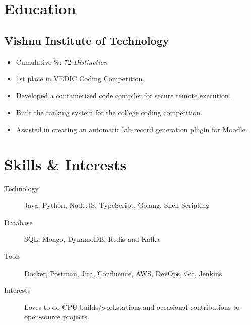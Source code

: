 \documentclass[11pt]{article}
\begin{document}
\section{Education}
\subsection{Vishnu Institute of Technology  }
\begin{itemize}
    \item Cumulative \(\%\): 72 \textit{Distinction}
    \item 1st place in VEDIC Coding Competition.
    \item Developed a containerized code compiler for secure remote execution.
    \item Built the ranking system for the college coding competition.
    \item Assisted in creating an automatic lab record generation plugin for Moodle.
\end{itemize}



\section{Skills \& Interests}
\begin{description}
	\item[Technology] Java, Python, Node.JS, TypeScript, Golang, Shell Scripting
    \item[Database] SQL, Mongo, DynamoDB, Redis and Kafka
    \item[Tools] Docker, Postman, Jira, Confluence, AWS, DevOps, Git, Jenkins
    \item[Interests] Loves to do CPU builds/workstations and occasional contributions to open-source projects.
\end{description}
\end{document}
